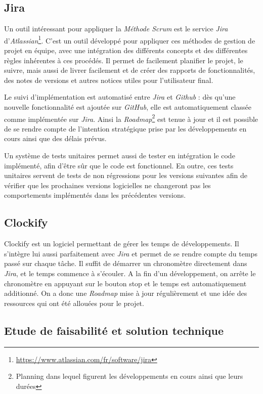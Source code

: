 		\subsection{Jira}

			Un outil intéressant pour appliquer la \textit{Méthode Scrum} est le service \textit{Jira} d'\textit{Atlassian}\footnote{\url{https://www.atlassian.com/fr/software/jira}}. C'est un outil développé pour appliquer ces méthodes de gestion de projet en équipe, avec une intégration des différents concepts et des différentes règles inhérentes à ces procédés. Il permet de facilement planifier le projet, le suivre, mais aussi de livrer facilement et de créer des rapports de fonctionnalités, des notes de versions et autres notices utiles pour l'utilisateur final.
		
			Le suivi d'implémentation est automatisé entre \textit{Jira} et \textit{Github} : dès qu'une nouvelle fonctionnalité est ajoutée sur \textit{GitHub}, elle est automatiquement classée comme implémentée sur \textit{Jira}. Ainsi la \textit{Roadmap}\footnote{Planning dans lequel figurent les développements en cours ainsi que leurs durées} est tenue à jour et il est possible de se rendre compte de l'intention stratégique prise par les développements en cours ainsi que des délais prévus.

			Un système de tests unitaires permet aussi de tester en intégration le code implémenté, afin d'être sûr que le code est fonctionnel. En outre, ces tests unitaires servent de tests de non régressions pour les versions suivantes afin de vérifier que les prochaines versions logicielles ne changeront pas les comportements implémentés dans les précédentes versions.

		\subsection{Clockify}
			
			Clockify est un logiciel permettant de gérer les temps de développements. Il s'intègre lui aussi parfaitement avec \textit{Jira} et permet de se rendre compte du temps passé sur chaque tâche. Il suffit de démarrer un chronomètre directement dans \textit{Jira}, et le temps commence à s'écouler. A la fin d'un développement, on arrête le chronomètre en appuyant sur le bouton stop et le temps est automatiquement additionné. On a donc une \textit{Roadmap} mise à jour régulièrement et une idée des ressources qui ont été allouées pour le projet.

		\subsection{Etude de faisabilité et solution technique}

